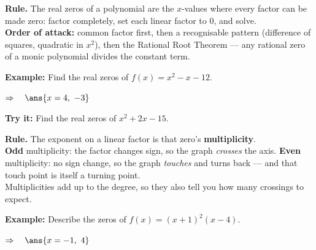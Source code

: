 \documentclass[12pt]{article}
\begin{document}


\begin{formulabox}
\textbf{Rule.} The real zeros of a polynomial are the $x$-values where every
factor can be made zero: factor completely, set each linear factor to $0$, and
solve.\\[3pt]
\textbf{Order of attack:} common factor first, then a recognisable pattern
(difference of squares, quadratic in $x^{2}$), then the Rational Root Theorem
--- any rational zero of a monic polynomial divides the constant term.
\end{formulabox}

\begin{examplebox}
\textbf{Example:} \quad Find the real zeros of $f(x) = x^{2} - x - 12$.

$\Rightarrow\quad \ans{x = 4,\ -3}$
\end{examplebox}

\begin{tryitbox}
\textbf{Try it:} \quad Find the real zeros of $x^{2} + 2x - 15$.\\[2pt]
\end{tryitbox}


\begin{formulabox}
\textbf{Rule.} The exponent on a linear factor is that zero's
\textbf{multiplicity}.\\[3pt]
\textbf{Odd} multiplicity: the factor changes sign, so the graph
\emph{crosses} the axis. \textbf{Even} multiplicity: no sign change, so the
graph \emph{touches} and turns back --- and that touch point is itself a
turning point.\\[3pt]
Multiplicities add up to the degree, so they also tell you how many crossings
to expect.
\end{formulabox}

\begin{examplebox}
\textbf{Example:} \quad Describe the zeros of $f(x) = (x + 1)^{2}(x - 4)$.

$\Rightarrow\quad \ans{x = -1,\ 4}$
\end{examplebox}
\end{document}
